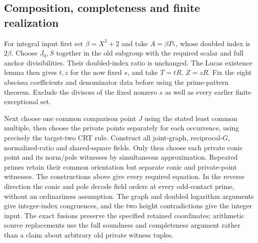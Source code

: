 \documentclass[11pt]{article}
\theoremstyle{definition}
\theoremstyle{remark}
\begin{document}
\subsection{Composition, completeness and finite realization}
\label{sec:quartic-composition}

For integral input first set $\beta=X^2+2$ and
take $A=\beta P_*$, whose doubled index is $2\beta$. Choose $J_0,S$ together in the old subgroup with the
required scalar and full anchor divisibilities. Their doubled-index ratio is unchanged. The Lucas existence lemma
then gives $t,z$ for the now fixed $s$, and take $T=tR$,
$Z=zR$. Fix the eight abscissa coefficients and denominator data before
using the prime-pattern theorem. Exclude the divisors of the fixed nonzero
$s$ as well as every earlier finite exceptional set.

Next choose one common comparison point $J$ using the stated least common
multiple, then choose the private points separately for each occurrence,
using precisely the target-two CRT rule.
Construct all joint-graph, reciprocal-$G$, normalized-ratio and
shared-square fields. Only then choose each private conic point and its
norm/pole witnesses by simultaneous approximation. Repeated primes retain
their common orientation but separate conic and private-point witnesses.
The constructions above give every required equation. In the reverse
direction the conic and pole decode field orders at every odd-contact
prime, without an ordinariness assumption. The graph and doubled logarithm
arguments give integer-index congruences, and the two height contradictions
give the integer input. The exact fusions preserve the specified
retained coordinates; arithmetic source replacements use the full
soundness and completeness argument rather than a claim about arbitrary
old private witness tuples.
\end{document}
